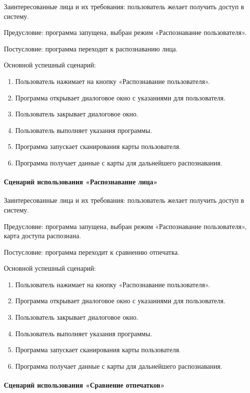 Заинтересованные лица и их требования: пользователь желает получить доступ в систему.

Предусловие: программа запущена, выбран режим «Распознавание пользователя».

Постусловие: программа переходит к распознаванию лица.

Основной успешный сценарий:
\begin{enumerate}
	\item Пользователь нажимает на кнопку «Распознавание пользователя».
	\item Программа открывает диалоговое окно с указаниями для пользователя.
	\item Пользователь закрывает диалоговое окно.
	\item Пользователь выполняет указания программы.
	\item Программа запускает сканирования карты пользователя.
	\item Программа получает данные с карты для дальнейшего распознавания.
\end{enumerate}

\paragraph{Сценарий использования «Распознавание лица»}

Заинтересованные лица и их требования: пользователь желает получить доступ в систему.

Предусловие: программа запущена, выбран режим «Распознавание пользователя», карта доступа распознана.

Постусловие: программа переходит к сравнению отпечатка.

Основной успешный сценарий:
\begin{enumerate}
	\item Пользователь нажимает на кнопку «Распознавание пользователя».
	\item Программа открывает диалоговое окно с указаниями для пользователя.
	\item Пользователь закрывает диалоговое окно.
	\item Пользователь выполняет указания программы.
	\item Программа запускает сканирования карты пользователя.
	\item Программа получает данные с карты для дальнейшего распознавания.
\end{enumerate}

\paragraph{Сценарий использования «Сравнение отпечатков»}

